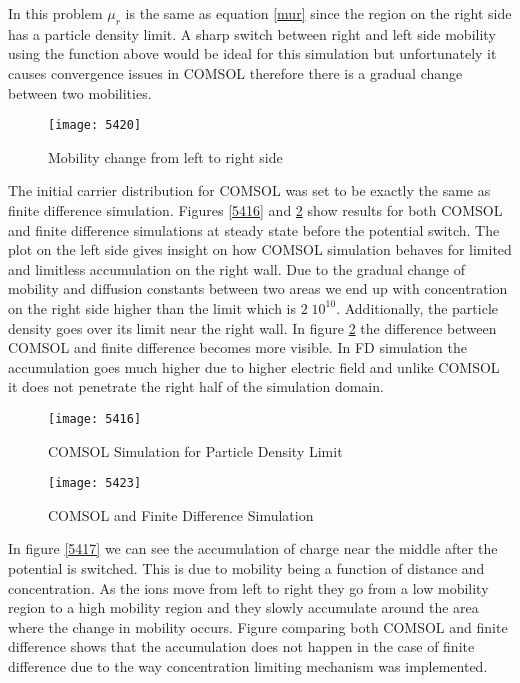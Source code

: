 In this problem $\mu_r$ is the same as equation \ref{mur} since the region on the right side has a particle density limit. A sharp switch between right and left side mobility using the function above would be ideal for this simulation but unfortunately it causes convergence issues in COMSOL therefore there is a gradual change between two mobilities. 

\begin{figure}[!htp]
\centering
\texttt{[image: 5420]}
\caption{Mobility change from left to right side} 
\label{5420}
\end{figure}

The initial carrier distribution for COMSOL was set to be exactly the same as finite difference simulation. Figures \ref{5416} and \ref{5423} show results for both COMSOL and finite difference simulations at steady state before the potential switch. The plot on the left side gives insight on how COMSOL simulation behaves for limited and limitless accumulation on the right wall. Due to the gradual change of mobility and diffusion constants between two areas we end up with concentration on the right side higher than the limit which is $2 \; 10^{10}$. Additionally, the particle density goes over its limit near the right wall. In figure \ref{5423} the difference between COMSOL and finite difference becomes more visible. In FD simulation the accumulation goes much higher due to higher electric field and unlike COMSOL it does not penetrate the right half of the simulation domain. 

\begin{figure}[ht]
\centering
\begin{minipage}[b]{0.45\linewidth}
\texttt{[image: 5416]}
\caption{COMSOL Simulation for Particle Density Limit}
\label{5416}
\end{minipage}
\quad
\begin{minipage}[b]{0.45\linewidth}
\texttt{[image: 5423]}
\caption{COMSOL and Finite Difference Simulation}
\label{5423}
\end{minipage}
\end{figure}


In figure \ref{5417} we can see the accumulation of charge near the middle after the potential is switched. This is due to mobility being a function of distance and concentration. As the ions move from left to right they go from a low mobility region to a high mobility region and they slowly accumulate around the area where the change in mobility occurs. Figure comparing both COMSOL and finite difference shows that the accumulation does not happen in the case of finite difference due to the way concentration limiting mechanism was implemented.

